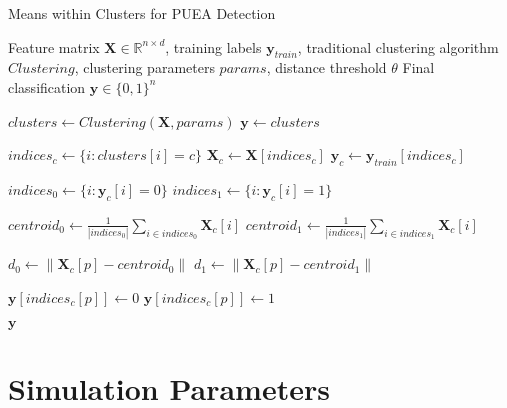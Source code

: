 \begin{algorithm}[H]
\caption{Means within Clusters for PUEA Detection}
\label{alg:means_clusters_full}
\begin{algorithmic}[1]
\Require Feature matrix $\mathbf{X} \in \mathbb{R}^{n \times d}$, training labels $\mathbf{y}_{train}$, traditional clustering algorithm $Clustering$, clustering parameters $params$, distance threshold $\theta$
\Ensure Final classification $\mathbf{y} \in \{0,1\}^n$

\State $clusters \gets Clustering(\mathbf{X}, params)$ 
\State $\mathbf{y} \gets clusters$ 

    \State $indices_c \gets \{i: clusters[i] = c\}$ 
    \State $\mathbf{X}_c \gets \mathbf{X}[indices_c]$ 
    \State $\mathbf{y}_c \gets \mathbf{y}_{train}[indices_c]$ 
    
    \State $indices_0 \gets \{i: \mathbf{y}_c[i] = 0\}$ 
    \State $indices_1 \gets \{i: \mathbf{y}_c[i] = 1\}$ 
    
     
        \State $centroid_0 \gets \frac{1}{|indices_0|} \sum_{i \in indices_0} \mathbf{X}_c[i]$ 
        \State $centroid_1 \gets \frac{1}{|indices_1|} \sum_{i \in indices_1} \mathbf{X}_c[i]$ 
        
            \State $d_0 \gets \|\mathbf{X}_c[p] - centroid_0\|$ 
            \State $d_1 \gets \|\mathbf{X}_c[p] - centroid_1\|$ 
            
                \State $\mathbf{y}[indices_c[p]] \gets 0$ 
            \Else
                \State $\mathbf{y}[indices_c[p]] \gets 1$ 
            \EndIf
        \EndFor
    \EndIf
\EndFor

\State \Return $\mathbf{y}$
\end{algorithmic}
\end{algorithm}

\section{Simulation Parameters}
\label{app:sim_params}

